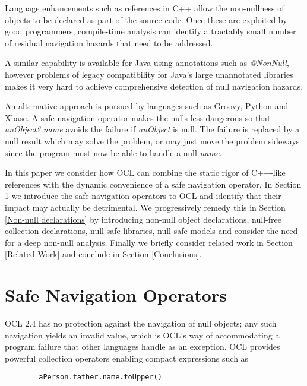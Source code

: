 \documentclass{llncs}
\begin{document}
Language enhancements such as references\cite{c++-references} in C++ allow the non-nullness of objects to be declared as part of the source code. Once these are exploited by good programmers, compile-time analysis can identify a tractably small number of residual navigation hazards that need to be addressed.

A similar capability is available for Java using annotations such as \emph{@NonNull}\cite{java-NonNull}, however problems of legacy compatibility for Java's large unannotated libraries makes it very hard to achieve comprehensive detection of null navigation hazards.

An alternative approach is pursued by languages such as Groovy\cite{groovy}, Python\cite{python} and Xbase\cite{xbase}. A safe navigation operator makes the nulls less dangerous so that \emph{anObject?.name} avoids the failure if \emph{anObject} is null. The failure is replaced by a null result which may solve the problem, or may just move the problem sideways since the program must now be able to handle a null \emph{name}.

In this paper we consider how OCL can combine the static rigor of C++-like references with the dynamic convenience of a safe navigation operator. In Section \ref{Safe Navigation Operators} we introduce the safe navigation operators to OCL and identify that their impact may actually be detrimental. We progressively remedy this in Section \ref{Non-null declarations} by introducing non-null object declarations, null-free collection declarations, null-safe libraries, null-safe models and consider the need for a deep non-null analysis. Finally we briefly consider related work in Section \ref{Related Work} and conclude in Section \ref{Conclusions}.

\section{Safe Navigation Operators}\label{Safe Navigation Operators}

OCL 2.4 has no protection against the navigation of null objects; any such navigation yields an invalid value, which is OCL's way of accommodating a program failure that other languages handle as an exception. OCL provides powerful collection operators enabling compact expressions such as

\begin{verbatim}
        aPerson.father.name.toUpper()
\end{verbatim}
\end{document}
